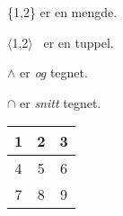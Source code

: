 \documentclass{innlevering}
\begin{document}

\begin{oppgave}{2}
\begin{deloppgaver}
\item{\{1,2\} er en mengde.}
\item{$\langle$1,2$\rangle$~ er en tuppel.}
\item{$\land$ er \emph{og} tegnet.}
\item{$\cap$ er \emph{snitt} tegnet.}
\end{deloppgaver}
\end{oppgave}

\begin{oppgave}{3}
\begin{tabular}{|c|c|c|}
     \hline
     1 & 2 & 3 \\
     \hline
     4 & 5 & 6 \\
     \hline
     7 & 8 & 9 \\
     \hline
\end{tabular}
\end{oppgave}
\end{document}
